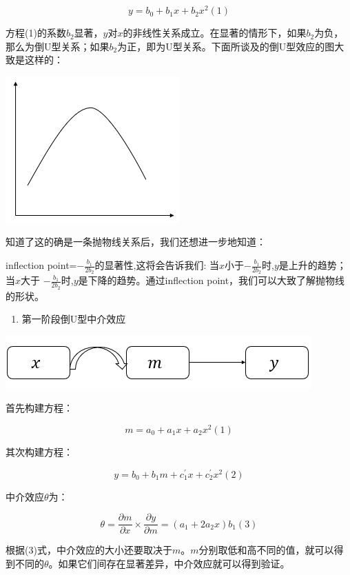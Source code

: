 \documentclass[
]{book}
\providecommand{\tightlist}{%
  \setlength{\itemsep}{0pt}\setlength{\parskip}{0pt}}
\begin{document}
\[
y=b_{0}+b_{1}x+b_{2}x^{2}(1)
\]

方程(1)的系数\(b_{2}\)显著，\(y\)对\(x\)的非线性关系成立。在显著的情形下，如果\(b_{2}\)为负，那么为倒U型关系；如果\(b_{2}\)为正，即为U型关系。下面所谈及的倒U型效应的图大致是这样的：

\includegraphics{figs/1221.png}

知道了这的确是一条抛物线关系后，我们还想进一步地知道：

inflection point=\(-\frac{b_{1}}{2b_{2}}\)的显著性,这将会告诉我们: 当\(x\)小于\(-\frac{b_{1}}{2b_{2}}\)时,\(y\)是上升的趋势；当\(x\)大于 \(-\frac{b_{1}}{2b_{2}}\)时,\(y\)是下降的趋势。通过inflection point，我们可以大致了解抛物线的形状。

\begin{enumerate}
\def\labelenumi{\arabic{enumi}.}
\setcounter{enumi}{1}
\tightlist
\item
  第一阶段倒U型中介效应
\end{enumerate}

\includegraphics{figs/1222.png}

首先构建方程：

\[
m=a_{0}+a_{1}x+a_{2}x^{2}(1)
\]

其次构建方程：

\[
y=b_{0}+b_{1}m+c^{'}_{1}x+c^{'}_{2}x^{2}(2)
\]

中介效应\(\theta\)为：

\[
\theta=\frac{\partial{m}}{\partial{x}}{\times}\frac{\partial{y}}{\partial{m}}=(a_{1}+2a_{2}x)b_{1}(3)
\]

根据(3)式，中介效应的大小还要取决于\(m\)。\(m\)分别取低和高不同的值，就可以得到不同的\(\theta\)。如果它们间存在显著差异，中介效应就可以得到验证。
\end{document}
